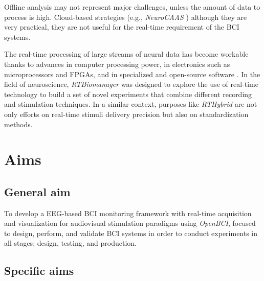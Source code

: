 Offline analysis may not represent major challenges, unless the amount of data to process is high. Cloud-based strategies (e.g., \textit{NeuroCAAS} \cite{abe2021neuroscience}) although they are very practical, they are not useful for the real-time requirement of the \gls*{BCI} systems.

The real-time processing of large streams of neural data has become workable thanks to advances in computer processing power, in electronics such as microprocessors and \glspl*{FPGA}, and in specialized and open-source software \cite{potter2014closed}. In the field of neuroscience, \textit{RTBiomanager} \cite{muniz2009rtbiomanager} was designed to explore the use of real-time technology to build a set of novel experiments that combine different recording and stimulation techniques. In a similar context, purposes like \textit{RTHybrid} \cite{amaducci2019rthybrid} are not only efforts on real-time stimuli delivery precision but also on standardization methods.

\section{Aims}\label{sec:objectives}

\subsection{General aim}

To develop a \gls*{EEG}-based \gls*{BCI} monitoring framework with real-time acquisition and visualization for audiovisual stimulation paradigms using \textit{OpenBCI}, focused to design, perform, and validate \gls*{BCI} systems in order to conduct experiments in all stages: design, testing, and production.

\subsection{Specific aims}

